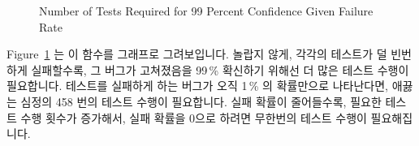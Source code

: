 \begin{figure}[tb]
\centering
{}
\caption{Number of Tests Required for 99 Percent Confidence Given Failure Rate}
\label{fig:debugging:Number of Tests Required for 99 Percent Confidence Given Failure Rate}
\end{figure}

Figure~\ref{fig:debugging:Number of Tests Required for 99 Percent Confidence Given Failure Rate}
는 이 함수를 그래프로 그려보입니다.
놀랍지 않게, 각각의 테스트가 덜 빈번하게 실패할수록, 그 버그가 고쳐졌음을
99\,\% 확신하기 위해선 더 많은 테스트 수행이 필요합니다.
테스트를 실패하게 하는 버그가 오직 1\,\% 의 확률만으로 나타난다면, 애끓는
심정의 458 번의 테스트 수행이 필요합니다.
실패 확률이 줄어들수록, 필요한 테스트 수행 횟수가 증가해서, 실패 확률을 0으로
하려면 무한번의 테스트 수행이 필요해집니다.

